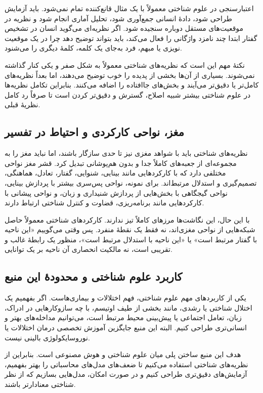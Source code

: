 اعتبارسنجی در علوم شناختی معمولاً با یک مثال قانع‌کننده تمام نمی‌شود. باید آزمایش طراحی شود، دادهٔ انسانی جمع‌آوری شود، تحلیل آماری انجام شود و نظریه در موقعیت‌های مستقل دوباره سنجیده شود. اگر نظریه‌ای می‌گوید انسان در تشخیص گفتار ابتدا چند نامزد واژگانی را فعال می‌کند، باید بتواند توضیح دهد چرا در یک موقعیت نویزی یا مبهم، فرد به‌جای یک کلمه، کلمهٔ دیگری را می‌شنود.

نکتهٔ مهم این است که نظریه‌های شناختی معمولاً به شکل صفر و یکی کنار گذاشته نمی‌شوند. بسیاری از آن‌ها بخشی از پدیده را خوب توضیح می‌دهند، اما بعداً نظریه‌های کامل‌تر یا دقیق‌تر می‌آیند و بخش‌های جاافتاده را اضافه می‌کنند. بنابراین تکامل نظریه‌ها در علوم شناختی بیشتر شبیه اصلاح، گسترش و دقیق‌تر کردن است تا صرفاً رد کامل نظریهٔ قبلی.

\subsection{مغز، نواحی کارکردی و احتیاط در تفسیر}
نظریه‌های شناختی باید با شواهد مغزی نیز تا حدی سازگار باشند، اما نباید مغز را به مجموعه‌ای از جعبه‌های کاملاً جدا و بدون هم‌پوشانی تبدیل کرد. قشر مغز نواحی مختلفی دارد که با کارکردهایی مانند بینایی، شنوایی، گفتار، تعادل، هماهنگی، تصمیم‌گیری و استدلال مرتبط‌اند. برای نمونه، نواحی پس‌سری بیشتر با پردازش بینایی، نواحی گیجگاهی با بخش‌هایی از پردازش شنیداری و زبان، و نواحی پیشانی با کارکردهایی مانند برنامه‌ریزی، قضاوت و کنترل شناختی ارتباط دارند.

با این حال، این نگاشت‌ها مرزهای کاملاً تیز ندارند. کارکردهای شناختی معمولاً حاصل شبکه‌هایی از نواحی مغزی‌اند، نه فقط یک نقطهٔ منفرد. پس وقتی می‌گوییم «این ناحیه با گفتار مرتبط است» یا «این ناحیه با استدلال مرتبط است»، منظور یک رابطهٔ غالب و تقریبی است، نه مالکیت انحصاری آن ناحیه بر یک توانایی.

\subsection{کاربرد علوم شناختی و محدودهٔ این منبع}
یکی از کاربردهای مهم علوم شناختی، فهم اختلالات و بیماری‌هاست. اگر بفهمیم یک اختلال شناختی یا رشدی، مانند بخشی از طیف اوتیسم، با چه سازوکارهایی در ادراک، زبان، تعامل اجتماعی یا پیش‌بینی محیط مرتبط است، می‌توانیم مداخله‌های بهتر و انسانی‌تری طراحی کنیم. البته این منبع جایگزین آموزش تخصصی درمان اختلالات یا نوروسایکولوژی بالینی نیست.

هدف این منبع ساختن پلی میان علوم شناختی و هوش مصنوعی است. بنابراین از نظریه‌های شناختی استفاده می‌کنیم تا ضعف‌های مدل‌های محاسباتی را بهتر بفهمیم، آزمایش‌های دقیق‌تری طراحی کنیم و در صورت امکان، مدل‌هایی بسازیم که از نظر شناختی معنادارتر باشند.

